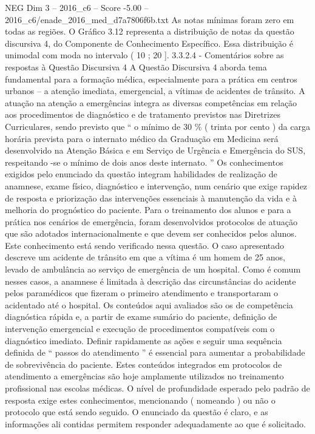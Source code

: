 \begin{textsample}{NEG Dim 3 – 2016\_c6 – Score -5.00 – 2016\_c6/enade\_2016\_med\_d7a7806f6b.txt}
As notas mínimas foram zero em todas as regiões.
O Gráfico 3.12 representa a distribuição de notas da questão discursiva 4, do Componente de Conhecimento Específico.
Essa distribuição é unimodal com moda no intervalo ( 10 ; 20 ]. 3.3.2.4 - Comentários sobre as respostas à Questão Discursiva 4 A Questão Discursiva 4 aborda tema fundamental para a formação médica, especialmente para a prática em centros urbanos – a atenção imediata, emergencial, a vítimas de acidentes de trânsito.
A atuação na atenção a emergências integra as diversas competências em relação aos procedimentos de diagnóstico e de tratamento previstos nas Diretrizes Curriculares, sendo previsto que “ o mínimo de 30 \% ( trinta por cento ) da carga horária prevista para o internato médico da Graduação em Medicina será desenvolvido na Atenção Básica e em Serviço de Urgência e Emergência do SUS, respeitando -se o mínimo de dois anos deste internato. ” Os conhecimentos exigidos pelo enunciado da questão integram habilidades de realização de anamnese, exame físico, diagnóstico e intervenção, num cenário que exige rapidez de resposta e priorização das intervenções essenciais à manutenção da vida e à melhoria do prognóstico do paciente.
Para o treinamento dos alunos e para a prática nos cenários de emergência, foram desenvolvidos protocolos de atuação que são adotados internacionalmente e que devem ser conhecidos pelos alunos.
Este conhecimento está sendo verificado nessa questão.
O caso apresentado descreve um acidente de trânsito em que a vítima é um homem de 25 anos, levado de ambulância ao serviço de emergência de um hospital.
Como é comum nesses casos, a anamnese é limitada à descrição das circunstâncias do acidente pelos paramédicos que fizeram o primeiro atendimento e transportaram o acidentado até o hospital.
Os conteúdos aqui avaliados são os de competência diagnóstica rápida e, a partir de exame sumário do paciente, definição de intervenção emergencial e execução de procedimentos compatíveis com o diagnóstico imediato.
Definir rapidamente as ações e seguir uma sequência definida de “ passos do atendimento ” é essencial para aumentar a probabilidade de sobrevivência do paciente.
Estes conteúdos integrados em protocolos de atendimento a emergências são hoje amplamente utilizados no treinamento profissional nas escolas médicas.
O nível de profundidade esperado pelo padrão de resposta exige estes conhecimentos, mencionando ( nomeando ) ou não o protocolo que está sendo seguido.
O enunciado da questão é claro, e as informações ali contidas permitem responder adequadamente ao que é solicitado.

\end{textsample}
